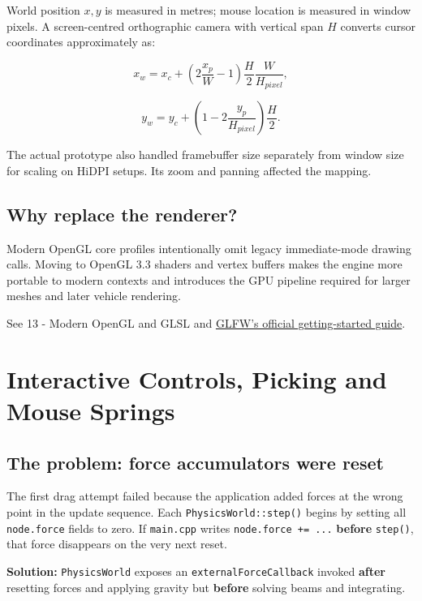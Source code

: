 \documentclass[
  10pt,
  a4paper,
]{article}
\begin{document}
World position \(x,y\) is measured in metres; mouse location is measured
in window pixels. A screen-centred orthographic camera with vertical
span \(H\) converts cursor coordinates approximately as:

\[x_w=x_c+\left(2\frac{x_p}{W}-1\right)\frac{H}{2}\frac{W}{H_{pixel}},\]

\[y_w=y_c+\left(1-2\frac{y_p}{H_{pixel}}\right)\frac{H}{2}.\]

The actual prototype also handled framebuffer size separately from
window size for scaling on HiDPI setups. Its zoom and panning affected
the mapping.

\subsection{Why replace the renderer?}\label{why-replace-the-renderer}

Modern OpenGL core profiles intentionally omit legacy immediate-mode
drawing calls. Moving to OpenGL 3.3 shaders and vertex buffers makes the
engine more portable to modern contexts and introduces the GPU pipeline
required for larger meshes and later vehicle rendering.

See 13 - Modern OpenGL and GLSL and
\href{https://www.glfw.org/docs/latest/quick_guide.html}{GLFW's official
getting-started guide}.

\newpage

\section{Interactive Controls, Picking and Mouse
Springs}\label{interactive-controls-picking-and-mouse-springs}

\subsection{The problem: force accumulators were
reset}\label{the-problem-force-accumulators-were-reset}

The first drag attempt failed because the application added forces at
the wrong point in the update sequence. Each
\texttt{PhysicsWorld::step()} begins by setting all \texttt{node.force}
fields to zero. If \texttt{main.cpp} writes \texttt{node.force\ +=\ ...}
\textbf{before} \texttt{step()}, that force disappears on the very next
reset.

\textbf{Solution:} \texttt{PhysicsWorld} exposes an
\texttt{externalForceCallback} invoked \textbf{after} resetting forces
and applying gravity but \textbf{before} solving beams and integrating.
\end{document}
